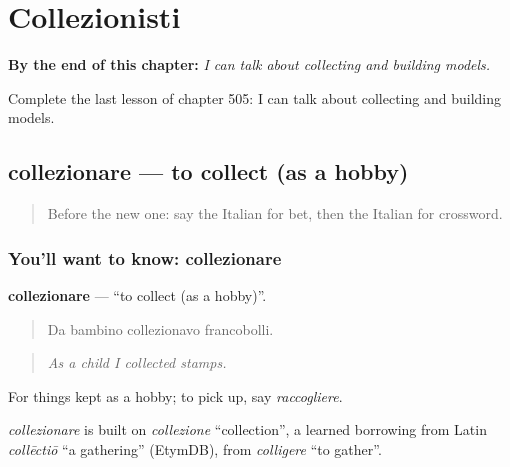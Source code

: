 
\chapter{Collezionisti}
\label{ch:it-collezionisti}

\begin{chapteropening}
\textbf{By the end of this chapter:} \emph{I can talk about collecting and building models.}

Complete the last lesson of chapter 505: I can talk about collecting and building models.
\end{chapteropening}

\section[collezionare]{collezionare — to collect (as a hobby)}

\label{lesson:IT-C505-collezionare}



\begin{quote}
Before the new one: say the Italian for bet, then the Italian for crossword.
\end{quote}

\subsection*{You'll want to know: collezionare}
\textbf{collezionare} — \textquotedblleft{}to collect (as a hobby)\textquotedblright{}.

\begin{quote}
Da bambino collezionavo francobolli.
\end{quote}

\begin{quote}
\emph{As a child I collected stamps.}
\end{quote}

For things kept as a hobby; to pick up, say \emph{raccogliere}.

\begin{cousinweb}
\emph{collezionare} is built on \emph{collezione} \textquotedblleft{}collection\textquotedblright{}, a learned borrowing from Latin \emph{collēctiō} \textquotedblleft{}a gathering\textquotedblright{} (EtymDB), from \emph{colligere} \textquotedblleft{}to gather\textquotedblright{}.
\end{cousinweb}

